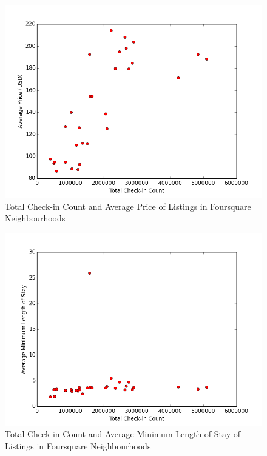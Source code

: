 \begin{figure}
\centering
\includegraphics[width=\columnwidth]{../checkin_avg_price.png}
\caption{Total Check-in Count and Average Price of Listings in Foursquare Neighbourhoods}
\label{fig:checkin_avg_price}
\end{figure}
\begin{figure}
\centering
\includegraphics[width=\columnwidth]{../checkin_avg_length.png}
\caption{Total Check-in Count and Average Minimum Length of Stay of Listings in Foursquare Neighbourhoods}
\label{fig:checkin_avg_length}
\end{figure}